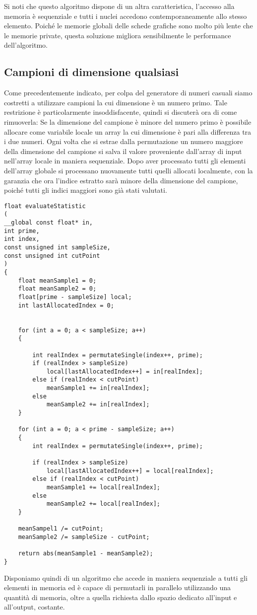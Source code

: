 Si noti che questo algoritmo dispone di un altra caratteristica, l'accesso alla memoria è sequenziale e tutti i nuclei accedono contemporaneamente allo stesso elemento. Poiché le memorie globali delle schede grafiche sono molto più lente che le memorie private, questa soluzione migliora sensibilmente le performance dell'algoritmo.

\subsection{Campioni di dimensione qualsiasi}
Come precedentemente indicato, per colpa del generatore di numeri casuali siamo costretti a utilizzare campioni la cui dimensione è un numero primo. Tale restrizione è particolarmente insoddisfacente, quindi si discuterà ora di come rimuoverla:
Se la dimensione del campione è minore del numero primo è possibile allocare come variabile locale un array la cui dimensione è pari alla differenza tra i due numeri. Ogni volta che si estrae dalla permutazione un numero maggiore della dimensione del campione si salva il valore proveniente dall'array di input nell'array locale in maniera sequenziale. Dopo aver processato tutti gli elementi dell'array globale si processano nuovamente tutti quelli allocati localmente, con la garanzia che ora l'indice estratto sarà minore della dimensione del campione, poiché tutti gli indici maggiori sono già stati valutati.


\begin{lstlisting}[style=CStyle]
float evaluateStatistic
(
__global const float* in,
int prime,
int index,
const unsigned int sampleSize, 
const unsigned int cutPoint
)
{
	float meanSample1 = 0;
	float meanSample2 = 0;
	float[prime - sampleSize] local;
	int lastAllocatedIndex = 0;
	
	
	for (int a = 0; a < sampleSize; a++)
	{
	
		int realIndex = permutateSingle(index++, prime);
		if (realIndex > sampleSize)
			local[lastAllocatedIndex++] = in[realIndex];
		else if (realIndex < cutPoint)
			meanSample1 += in[realIndex];
		else
			meanSample2 += in[realIndex];
	}
	
	for (int a = 0; a < prime - sampleSize; a++)
	{
		int realIndex = permutateSingle(index++, prime);
		
		if (realIndex > sampleSize)
			local[lastAllocatedIndex++] = local[realIndex];
		else if (realIndex < cutPoint)
			meanSample1 += local[realIndex];	
		else
			meanSample2 += local[realIndex];
	}
	
	meanSampel1 /= cutPoint;
	meanSample2 /= sampleSize - cutPoint;	
	
	return abs(meanSample1 - meanSample2);
}
\end{lstlisting}


Disponiamo quindi di un algoritmo che accede in maniera sequenziale a tutti gli elementi in memoria ed è capace di permutarli in parallelo utilizzando una quantità di memoria, oltre a quella richiesta dallo spazio dedicato all'input e all'output, costante.